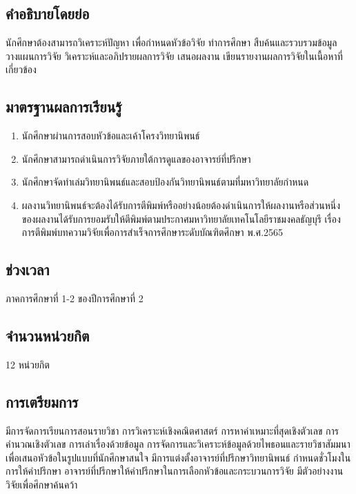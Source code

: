 {{{\subsection{คำอธิบายโดยย่อ}
นักศึกษาต้องสามารถวิเคราะห์ปัญหา เพื่อกำหนดหัวข้อวิจัย ทำการศึกษา สืบค้นและรวบรวมข้อมูล วางแผนการวิจัย วิเคราะห์และอภิปรายผลการวิจัย เสนอผลงาน เขียนรายงานผลการวิจัยในเนื้อหาที่เกี่ยวข้อง
\subsection{มาตรฐานผลการเรียนรู้}
\begin{enumerate}
	\item นักศึกษาผ่านการสอบหัวข้อและเค้าโครงวิทยานิพนธ์
	\item นักศึกษาสามารถดำเนินการวิจัยภายใต้การดูแลของอาจารย์ที่ปรึกษา
	\item นักศึกษาจัดทำเล่มวิทยานิพนธ์และสอบป้องกันวิทยานิพนธ์ตามที่มหาวิทยาลัยกำหนด
	\item ผลงานวิทยานิพนธ์จะต้องได้รับการตีพิมพ์หรืออย่างน้อยต้องดำเนินการให้ผลงานหรือส่วนหนึ่งของผลงานได้รับการยอมรับให้ตีพิมพ์ตามประกาศมหาวิทยาลัยเทคโนโลยีราชมงคลธัญบุรี เรื่อง การตีพิมพ์บทความวิจัยเพื่อการสำเร็จการศึกษาระดับบัณฑิตศึกษา พ.ศ.2565
\end{enumerate}

\subsection{ช่วงเวลา}
ภาคการศึกษาที่ 1-2 ของปีการศึกษาที่ 
2

\subsection{จำนวนหน่วยกิต}
12 หน่วยกิต


\subsection{การเตรียมการ}

มีการจัดการเรียนการสอนรายวิชา
การวิเคราะห์เชิงคณิตศาสตร์ การหาค่าเหมาะที่สุดเชิงตัวเลข การคำนวณเชิงตัวเลข การเล่าเรื่องด้วยข้อมูล การจัดการและวิเคราะห์ข้อมูลด้วยไพธอนและรายวิชาสัมมนา เพื่อเสนอหัวข้อในรูปแบบที่นักศึกษาสนใจ มีการแต่งตั้งอาจารย์ที่ปรึกษาวิทยานิพนธ์ กำหนดชั่วโมงในการให้คำปรึกษา อาจารย์ที่ปรึกษาให้คำปรึกษาในการเลือกหัวข้อและกระบวนการวิจัย มีตัวอย่างงานวิจัยเพื่อศึกษาค้นคว้า

}}}
